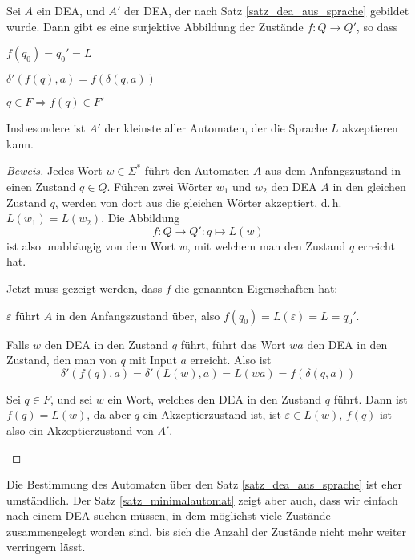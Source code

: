 \begin{satz}[Minimalautomat]\label{satz_minimalautomat}
Sei $A$ ein DEA, und $A'$ der DEA, der nach
Satz \ref{satz_dea_aus_sprache} gebildet wurde.
Dann gibt es eine surjektive Abbildung der Zustände $f\colon Q\to Q'$, so dass
\begin{compactenum}
\item $f(q_0)=q_0'=L$
\item $\delta'(f(q),a)=f(\delta(q,a))$
\item $q\in F\Rightarrow f(q)\in F'$
\end{compactenum}
Insbesondere ist $A'$ der kleinste aller Automaten, der die Sprache
$L$ akzeptieren kann.
\end{satz}

\begin{proof}[Beweis]
Jedes Wort $w\in\Sigma^*$ führt den Automaten $A$ aus dem
Anfangszustand in einen Zustand $q\in Q$.
Führen zwei Wörter $w_1$ und $w_2$ den DEA $A$ in den gleichen Zustand $q$,
werden von dort aus die gleichen Wörter akzeptiert, d.\,h.~$L(w_1)=L(w_2)$.
Die Abbildung
\[
f\colon Q\to Q': q\mapsto L(w)
\]
ist also unabhängig von dem Wort $w$, mit welchem man den Zustand $q$
erreicht hat.

Jetzt muss gezeigt werden, dass $f$ die genannten Eigenschaften hat:
\begin{compactenum}
\item
$\varepsilon$ führt $A$ in den Anfangszustand über, also
$f(q_0)=L(\varepsilon)=L=q_0'$.
\item Falls $w$ den DEA in den Zustand $q$ führt, führt das Wort
$wa$ den DEA in den Zustand, den man von $q$ mit Input $a$ erreicht.
Also ist
\[
\delta'(f(q),a)=\delta'(L(w), a)=L(wa)=f(\delta(q,a))
\]
\item Sei $q\in F$, und sei $w$ ein Wort, welches den DEA in den Zustand 
$q$ führt.
Dann ist $f(q)=L(w)$, da aber $q$ ein Akzeptierzustand ist,
ist $\varepsilon\in L(w)$, $f(q)$ ist also ein Akzeptierzustand von
$A'$.
\end{compactenum}

\end{proof}

Die Bestimmung des Automaten über den Satz \ref{satz_dea_aus_sprache}
ist eher umständlich.
Der Satz \ref{satz_minimalautomat} zeigt
aber auch, dass wir einfach nach einem DEA suchen müssen, in dem
möglichst viele Zustände zusammengelegt worden sind, bis sich die
Anzahl der Zustände nicht mehr weiter verringern lässt.

